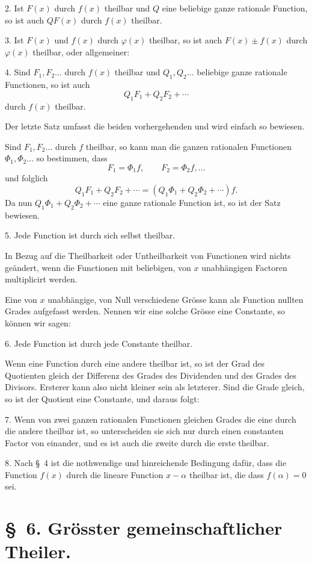 \documentclass[11pt]{article}
\begin{document}
2. Ist $F(x)$ durch $f(x)$ theilbar und $Q$ eine beliebige ganze rationale Function, so ist auch $QF(x)$ durch $f(x)$ theilbar.

3. Ist $F(x)$ und $f(x)$ durch $\varphi(x)$ theilbar, so ist auch $F(x)\pm f(x)$ durch $\varphi(x)$ theilbar, oder allgemeiner:

4. Sind $F_1,F_2\ldots$ durch $f(x)$ theilbar und $Q_1,Q_2\ldots$ beliebige ganze rationale Functionen, so ist auch
\[
 Q_1F_1+Q_2F_2+\cdots
\]
durch $f(x)$ theilbar.

Der letzte Satz umfasst die beiden vorhergehenden und wird einfach so bewiesen.

Sind $F_1,F_2\ldots$ durch $f$ theilbar, so kann man die ganzen rationalen Functionen $\Phi_1,\Phi_2\ldots$ so bestimmen, dass
\[
 F_1=\Phi_1f,\qquad F_2=\Phi_2f,\ldots
\]
und folglich
\[
 Q_1F_1+Q_2F_2+\cdots=(Q_1\Phi_1+Q_2\Phi_2+\cdots)f.
\]
Da nun $Q_1\Phi_1+Q_2\Phi_2+\cdots$ eine ganze rationale Function ist, so ist der Satz bewiesen.

5. Jede Function ist durch sich selbst theilbar.

In Bezug auf die Theilbarkeit oder Untheilbarkeit von Functionen wird nichts geändert, wenn die Functionen mit beliebigen, von $x$ unabhängigen Factoren multiplicirt werden.

Eine von $x$ unabhängige, von Null verschiedene Grösse kann als Function nullten Grades aufgefasst werden. Nennen wir eine solche Grösse eine Constante, so können wir sagen:

6. Jede Function ist durch jede Constante theilbar.

Wenn eine Function durch eine andere theilbar ist, so ist der Grad des Quotienten gleich der Differenz des Grades des Dividenden und des Grades des Divisors. Ersterer kann also nicht kleiner sein als letzterer. Sind die Grade gleich, so ist der Quotient eine Constante, und daraus folgt:

7. Wenn von zwei ganzen rationalen Functionen gleichen Grades die eine durch die andere theilbar ist, so unterscheiden sie sich nur durch einen constanten Factor von einander, und es ist auch die zweite durch die erste theilbar.

8. Nach \S~4 ist die nothwendige und hinreichende Bedingung dafür, dass die Function $f(x)$ durch die lineare Function $x-\alpha$ theilbar ist, die dass $f(\alpha)=0$ sei.

\section*{\S~6. Grösster gemeinschaftlicher Theiler.}
\end{document}
